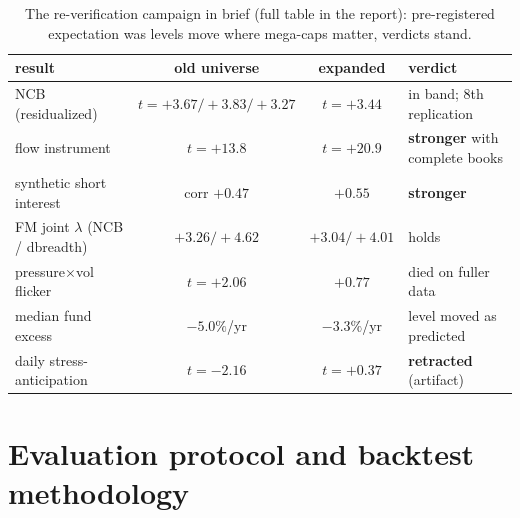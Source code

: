 \documentclass[10pt]{article}
\begin{document}
\begin{table}[h]
\centering\scriptsize
\caption{The re-verification campaign in brief (full table in the
report): pre-registered expectation was levels move where mega-caps
matter, verdicts stand.}
\begin{tabular}{lccl}
\toprule
result & old universe & expanded & verdict \\
\midrule
NCB (residualized) & $t=+3.67/+3.83/+3.27$ & $t=+3.44$ & in band; 8th replication \\
flow instrument & $t=+13.8$ & $t=+20.9$ & \textbf{stronger} with complete books \\
synthetic short interest & corr $+0.47$ & $+0.55$ & \textbf{stronger} \\
FM joint $\lambda$ (NCB / dbreadth) & $+3.26/+4.62$ & $+3.04/+4.01$ & holds \\
pressure$\times$vol flicker & $t=+2.06$ & $+0.77$ & died on fuller data \\
median fund excess & $-5.0\%$/yr & $-3.3\%$/yr & level moved as predicted \\
daily stress-anticipation & $t=-2.16$ & $t=+0.37$ & \textbf{retracted} (artifact) \\
\bottomrule
\end{tabular}
\end{table}

\section{Evaluation protocol and backtest methodology}
\end{document}
